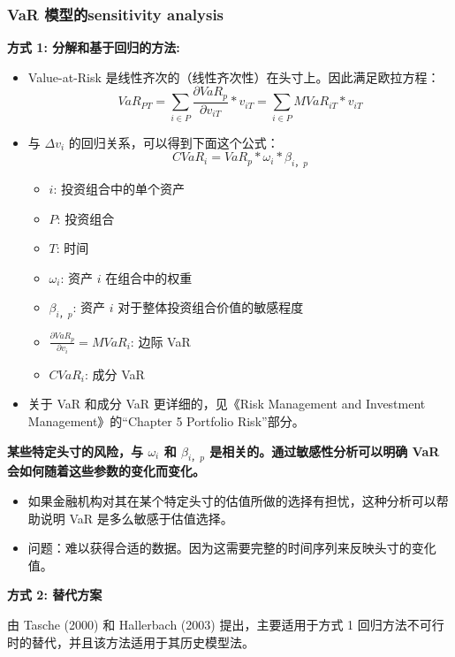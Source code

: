 \subsubsection{VaR 模型的sensitivity analysis}
\textbf{方式 1: 分解和基于回归的方法:}

\begin{itemize}
    \item Value-at-Risk 是线性齐次的（线性齐次性）在头寸上。因此满足欧拉方程：
    \[
    VaR_{PT} = \sum_{i \in P} \frac{\partial VaR_{p}}{\partial v_{iT}} * v_{iT} = \sum_{i \in P} MVaR_{iT} * v_{iT}
    \]
    \item 与 \( \Delta v_i \) 的回归关系，可以得到下面这个公式：
    \[
    CVaR_{i} = VaR_{p} * \omega_{i} * \beta_{i，p}
    \]
    \begin{itemize}
        \item \( i \): 投资组合中的单个资产
        \item \( P \): 投资组合
        \item \( T \): 时间
        \item \( \omega_{i} \): 资产 \( i \) 在组合中的权重
        \item \( \beta_{i，p} \): 资产 \( i \) 对于整体投资组合价值的敏感程度
        \item \( \frac{\partial VaR_{p}}{\partial v_{i}} = MVaR_{i} \): 边际 VaR
        \item \( CVaR_{i} \): 成分 VaR
    \end{itemize}
    \item 关于 VaR 和成分 VaR 更详细的，见《Risk Management and Investment Management》的“Chapter 5 Portfolio Risk”部分。
\end{itemize}

\textbf{某些特定头寸的风险，与 \( \omega_{i} \) 和 \( \beta_{i，p} \) 是相关的。通过敏感性分析可以明确 VaR 会如何随着这些参数的变化而变化。}

\begin{itemize}
    \item 如果金融机构对其在某个特定头寸的估值所做的选择有担忧，这种分析可以帮助说明 VaR 是多么敏感于估值选择。
    \item 问题：难以获得合适的数据。因为这需要完整的时间序列来反映头寸的变化值。
\end{itemize}

\textbf{方式 2: 替代方案}

由 Tasche (2000) 和 Hallerbach (2003) 提出，主要适用于方式 1 回归方法不可行时的替代，并且该方法适用于其历史模型法。

